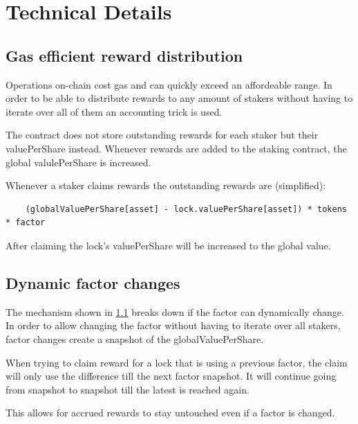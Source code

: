 \documentclass{article}
\begin{document}
\section{Technical Details}
\subsection{Gas efficient reward distribution}
\label{sec:reward-distribution}
Operations on-chain cost gas and can quickly exceed an affordeable range.
In order to be able to distribute rewards to any amount of stakers without having to iterate over all of them an accounting trick is used.

The contract does not store outstanding rewards for each staker but their valuePerShare instead.
Whenever rewards are added to the staking contract, the global valulePerShare is increased.

Whenever a staker claims rewards the outstanding rewards are (simplified):

\begin{verbatim}
    (globalValuePerShare[asset] - lock.valuePerShare[asset]) * tokens * factor
\end{verbatim}

After claiming the lock's valuePerShare will be increased to the global value.

\subsection{Dynamic factor changes}

The mechanism shown in \ref{sec:reward-distribution} breaks down if the factor can dynamically change.
In order to allow changing the factor without having to iterate over all stakers, factor changes create a snapshot of the globalValuePerShare.

When trying to claim reward for a lock that is using a previous factor, the claim will only use the difference till the next factor snapshot.
It will continue going from snapshot to snapshot till the latest is reached again.

This allows for accrued rewards to stay untouched even if a factor is changed.
\end{document}
